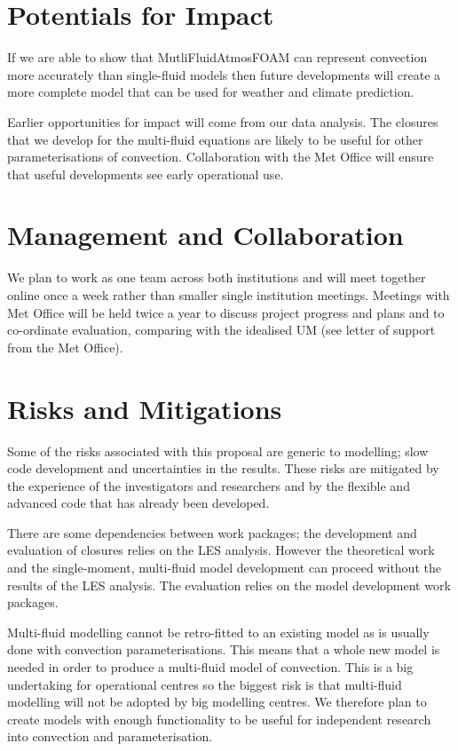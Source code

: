 \documentclass[11pt,a4paper]{article}
\begin{document}
\section{Potentials for Impact}

If we are able to show that MutliFluidAtmosFOAM can represent convection more accurately than single-fluid models then future developments will create a more complete model that can be used for weather and climate prediction.

Earlier opportunities for impact will come from our data analysis. The closures that we develop for the multi-fluid equations are likely to be useful for other parameterisations of convection. Collaboration with the Met Office will ensure that useful developments see early operational use. 

\section{Management and Collaboration}

We plan to work as one team across both institutions and will meet together online once a week rather than smaller single institution meetings. Meetings with Met Office will be held twice a year to discuss project progress and plans and to co-ordinate evaluation, comparing with the idealised UM (see letter of support from the Met Office).

\section{Risks and Mitigations}

Some of the risks associated with this proposal are generic to modelling; slow code development and uncertainties in the results. These risks are mitigated by the experience of the investigators and researchers and by the flexible and advanced code that has already been developed.

There are some dependencies between work packages; the development and evaluation of closures relies on the LES analysis. However the theoretical work and the single-moment, multi-fluid model development can proceed without the results of the LES analysis. The evaluation relies on the model development work packages.

Multi-fluid modelling cannot be retro-fitted to an existing model as is usually done with convection parameterisations. This means that a whole new model is needed in order to produce a multi-fluid model of convection. This is a big undertaking for operational centres so the biggest risk is that multi-fluid modelling will not be adopted by big modelling centres. We therefore plan to create models with enough functionality to be useful for independent research into convection and parameterisation.



%
\end{document}
